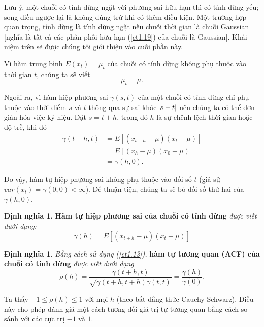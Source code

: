 \documentclass[12pt, a4paper,oneside]{book}
\theoremstyle{definition}
\newtheorem{dn}[theo]{Định nghĩa}
\begin{document}
Lưu ý, một chuỗi có tính dừng ngặt với phương sai hữu hạn thì có tính dừng yếu; song điều ngược lại là không đúng trừ khi có thêm điều kiện. Một trường hợp quan trọng, tính dừng là tính dừng ngặt nếu chuỗi thời gian là chuỗi Gaussian [nghĩa là tất cả các phân phối hữu hạn (\ref{ct1.19}) của chuỗi là Gaussian]. Khái niệm trên sẽ được chúng tôi giới thiệu vào cuối phần này.

Vì hàm trung bình $E(x_{t})=\mu_{t}$ của chuỗi có tính dừng không phụ thuộc vào thời gian $t$, chúng ta sẽ viết
\begin{equation}
\mu_{t}=\mu. \label{ct1.23}
\end{equation}

Ngoài ra, vì hàm hiệp phương sai  $\gamma(s, t)$ của một chuỗi có tính dừng chỉ phụ thuộc vào thời điểm $s$ và $t$ thông qua sự sai khác $ \abs{s-t} $ nên chúng ta có thể đơn giản hóa việc ký hiệu. Đặt $s = t + h$, trong đó $h$ là sự chênh lệch thời gian hoặc độ trễ, khi đó
\begin{align*}
\gamma(t+h, t)&= E[(x_{t+h}-\mu)(x_{t}-\mu)]\\
&=E[(x_{h}-\mu)(x_{0}-\mu)]\\
&=\gamma(h,0).
\end{align*}

Do vậy, hàm tự hiệp phương sai không phụ thuộc vào đối số $t$ (giả sử $var(x_{t}) =\gamma(0,0) < \infty $). Để thuận tiện, chúng ta sẽ bỏ đối số thứ hai của $\gamma(h,0)$.

\begin{dn}\cite{8} \textbf{Hàm tự hiệp phương sai của chuỗi có tính dừng}\textit{ được viết dưới dạng: 
		\begin{equation}
		\gamma(h)= E[(x_{t+h}-\mu)(x_{t}-\mu)] \label{ct1.24}
		\end{equation}	}
\end{dn}
\begin{dn}\cite{8} \textit{Bằng cách sử dụng (\ref{ct1.13}),}  \textbf{hàm tự tương quan (ACF) của chuỗi có tính dừng} \textit{được viết dưới dạng
		\begin{equation}
		\rho(h)=\frac{\gamma(t+h,t)}{\sqrt{\gamma(t+h,t+h)\gamma(t,t)}}=\dfrac{\gamma(h)}{\gamma(0)}. \label{ct1.25}
		\end{equation}}
\end{dn}

Ta thấy $−1\leqslant \rho(h) \leqslant 1$ với mọi $h$ (theo bất đẳng thức Cauchy-Schwarz). Điều này cho phép đánh giá một cách tương đối giá trị tự tương quan bằng cách so sánh với các cực trị $−1$ và $1$.
\end{document}

